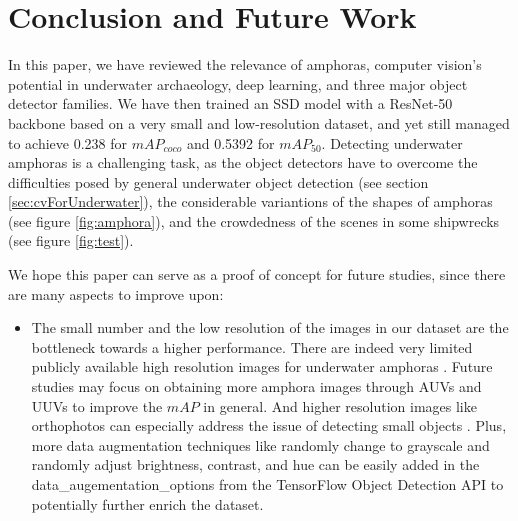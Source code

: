 \documentclass[a4paper, 11pt, oneside]{article}
\begin{document}
  \clearpage

  \section{Conclusion and Future Work}

  In this paper, we have reviewed the relevance of amphoras, computer vision's potential in underwater archaeology, deep
  learning, and three major object detector families. We have then trained an SSD model with a ResNet-50 backbone
  based on a very small and low-resolution dataset, and yet still managed to achieve 0.238 for $mAP_{coco}$ and 0.5392
  for $mAP_{50}$. Detecting underwater amphoras is a challenging task, as the object detectors have to overcome the
  difficulties posed by general underwater object detection (see section \ref{sec:cvForUnderwater}), the considerable
  variantions of the shapes of amphoras (see figure \ref{fig:amphora}), and the crowdedness of the scenes in some
  shipwrecks (see figure \ref{fig:test}).

  We hope this paper can serve as a proof of concept for future studies, since there are many aspects to improve upon:

  \begin{itemize}
    \item The small number and the low resolution of the images in our dataset are the bottleneck towards a higher
    performance. There are indeed very limited publicly available high resolution images for underwater amphoras
    \cite{pasquet2017amphora}. Future studies may focus on obtaining more amphora images through AUVs and UUVs to improve
    the $mAP$ in general. And higher resolution images like orthophotos can especially address the issue of detecting
    small objects \cite{kisantal2019augmentation}. Plus, more data augmentation techniques like randomly change to grayscale
    and randomly adjust brightness, contrast, and hue can be easily added in the data\_augementation\_options from the
    TensorFlow Object Detection API to potentially further enrich the dataset.
  \end{itemize}


  \newpage

  \printbibliography
\end{document}
